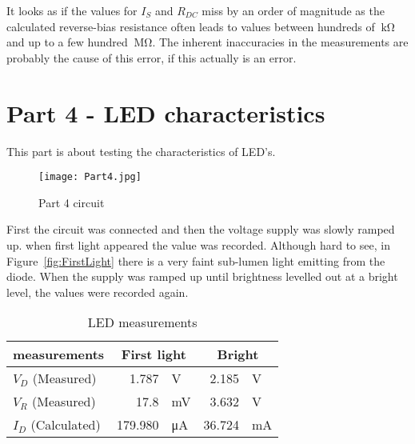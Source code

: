 \documentclass{article}
\begin{document}
It looks as if the values for \(I_S\) and \(R_{DC}\) miss by an order of magnitude as the calculated reverse-bias resistance often leads to values between hundreds of \(\SI{}{\kilo\ohm}\) and up to a few hundred \(\SI{}{\mega\ohm}\). The inherent inaccuracies in the measurements are probably the cause of this error, if this actually is an error.



\section{Part 4 - LED characteristics}
This part is about testing the characteristics of LED's. 


\begin{figure}[h] %
    \centering
    \texttt{[image: Part4.jpg]}
    \caption{Part 4 circuit}
    \label{fig:Part4}
\end{figure}

First the circuit was connected and then the voltage supply was slowly ramped up. when first light appeared the value was recorded. Although hard to see, in Figure~\ref{fig:FirstLight} there is a very faint sub-lumen light emitting from the diode. When the supply was ramped up until brightness levelled out at a bright level, the values were recorded again.

\clearpage


\begin{table}[htbp] %
  \centering
  \caption{LED measurements}
    \begin{tabular}{|l|rl|rl|}
    \hline
    measurements & \multicolumn{2}{c|}{First light} & \multicolumn{2}{c|}{Bright} \bigstrut\\
    \hline
    \(V_D\) (Measured)   & 1.787   & V   & 2.185  & V \bigstrut\\
    \hline
    \(V_R\) (Measured)   & 17.8    & mV  & 3.632  & V \bigstrut\\
    \hline
    \(I_D\) (Calculated) & 179.980 & μA  & 36.724 & mA \bigstrut\\
    \hline
    \end{tabular}%
  \label{tab:part4}%
\end{table}%
\end{document}
